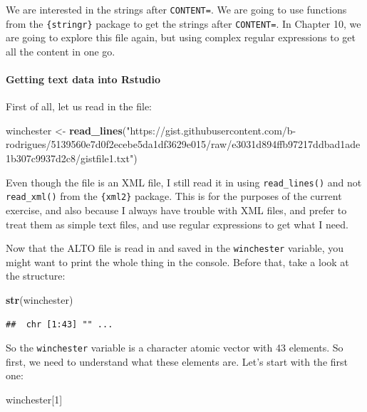 \documentclass[]{gitbook}
\newenvironment{Shaded}{\begin{snugshade}}{\end{snugshade}}
\newcommand{\DecValTok}[1]{\textcolor[rgb]{0.00,0.00,0.81}{#1}}
\newcommand{\KeywordTok}[1]{\textcolor[rgb]{0.13,0.29,0.53}{\textbf{#1}}}
\newcommand{\NormalTok}[1]{#1}
\newcommand{\StringTok}[1]{\textcolor[rgb]{0.31,0.60,0.02}{#1}}
\let\oldparagraph\paragraph
\renewcommand{\paragraph}[1]{\oldparagraph{#1}\mbox{}}
\begin{document}
We are interested in the strings after \texttt{CONTENT=}. We are going to use functions from the \texttt{\{stringr\}}
package to get the strings after \texttt{CONTENT=}. In Chapter 10, we are going to explore this file
again, but using complex regular expressions to get all the content in one go.

\hypertarget{getting-text-data-into-rstudio}{%
\paragraph{Getting text data into Rstudio}\label{getting-text-data-into-rstudio}}

First of all, let us read in the file:

\begin{Shaded}
\begin{Highlighting}[]
\NormalTok{winchester <-}\StringTok{ }\KeywordTok{read_lines}\NormalTok{(}\StringTok{"https://gist.githubusercontent.com/b-rodrigues/5139560e7d0f2ecebe5da1df3629e015/raw/e3031d894ffb97217ddbad1ade1b307c9937d2c8/gistfile1.txt"}\NormalTok{)}
\end{Highlighting}
\end{Shaded}

Even though the file is an XML file, I still read it in using \texttt{read\_lines()} and not \texttt{read\_xml()}
from the \texttt{\{xml2\}} package. This is for the purposes of the current exercise, and also because I
always have trouble with XML files, and prefer to treat them as simple text files, and use regular
expressions to get what I need.

Now that the ALTO file is read in and saved in the \texttt{winchester} variable, you might want to print
the whole thing in the console. Before that, take a look at the structure:

\begin{Shaded}
\begin{Highlighting}[]
\KeywordTok{str}\NormalTok{(winchester)}
\end{Highlighting}
\end{Shaded}

\begin{verbatim}
##  chr [1:43] "" ...
\end{verbatim}

So the \texttt{winchester} variable is a character atomic vector with 43 elements. So first, we need to
understand what these elements are. Let's start with the first one:

\begin{Shaded}
\begin{Highlighting}[]
\NormalTok{winchester[}\DecValTok{1}\NormalTok{]}
\end{Highlighting}
\end{Shaded}
\end{document}
